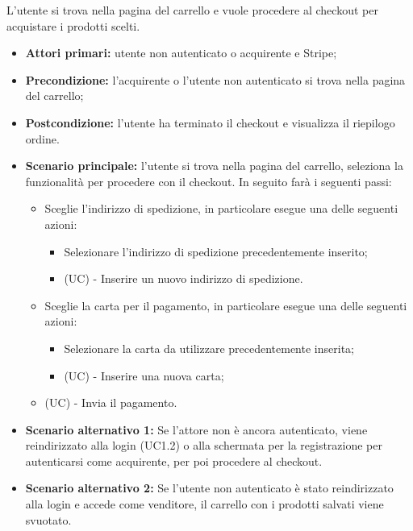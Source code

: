 L'utente si trova nella pagina del carrello e vuole procedere al checkout per acquistare i prodotti scelti.
\begin{itemize}
    \item \textbf{Attori primari:} utente non autenticato o acquirente e Stripe;
    \item \textbf{Precondizione:} l'acquirente o l'utente non autenticato si trova nella pagina del carrello;
    \item \textbf{Postcondizione:} l'utente ha terminato il checkout e visualizza il riepilogo ordine.
    \item \textbf{Scenario principale:} l'utente si trova nella pagina del carrello, seleziona la funzionalità per procedere con il checkout. In seguito farà i seguenti passi:
    \begin{itemize}
    	\item Sceglie l'indirizzo di spedizione, in particolare esegue una delle seguenti azioni: 
    	\begin{itemize}
    		\item Selezionare l'indirizzo di spedizione precedentemente inserito;
    		\item (UC) - Inserire un nuovo indirizzo di spedizione.
    	\end{itemize}
    	\item Sceglie la carta per il pagamento, in particolare esegue una delle seguenti azioni: 
    	\begin{itemize}
    		\item Selezionare la carta da utilizzare precedentemente inserita;
    		\item (UC) - Inserire una nuova carta;
    	\end{itemize}
        \item (UC) - Invia il pagamento.
    \end{itemize}
    \item \textbf{Scenario alternativo 1:} Se l'attore non è ancora autenticato, viene reindirizzato alla login (UC1.2) o alla schermata per la registrazione per autenticarsi come acquirente, per poi procedere al checkout.
    \item \textbf{Scenario alternativo 2:} Se l'utente non autenticato è stato reindirizzato alla login e accede come venditore, il carrello con i prodotti salvati viene svuotato.
\end{itemize}

\resetSubUC

